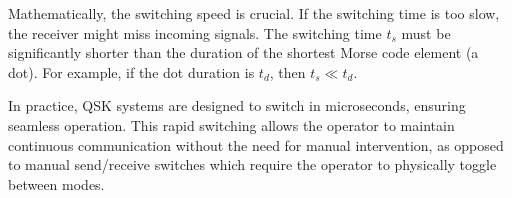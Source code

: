 Mathematically, the switching speed is crucial. If the switching time is too slow, the receiver might miss incoming signals. The switching time \( t_s \) must be significantly shorter than the duration of the shortest Morse code element (a dot). For example, if the dot duration is \( t_d \), then \( t_s \ll t_d \).

In practice, QSK systems are designed to switch in microseconds, ensuring seamless operation. This rapid switching allows the operator to maintain continuous communication without the need for manual intervention, as opposed to manual send/receive switches which require the operator to physically toggle between modes.

